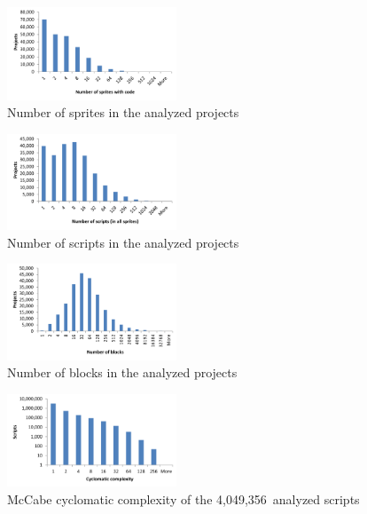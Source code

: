 \documentclass{sig-alternate-05-2015}
\newcommand{\nscripts}{4,049,356}
\begin{document}
\begin{figure}
	\centering
	\includegraphics[width=0.45\textwidth]{fig/charts/1sprites}
	\vspace{-1em}
	\caption{Number of sprites in the analyzed projects}
	\label{fig:size-sprites}
\end{figure}
\begin{figure}
	\centering
	\includegraphics[width=0.45\textwidth]{fig/charts/1scripts}
	\vspace{-1em}
	\caption{Number of scripts in the analyzed projects}
	\label{fig:size-scripts}
\end{figure}
\begin{figure}
	\centering
	\includegraphics[width=0.45\textwidth]{fig/charts/1locs}
	\vspace{-1em}
	\caption{Number of blocks in the analyzed projects}
	\label{fig:size-locs}
\end{figure}
\begin{figure}
	\centering
	\includegraphics[width=0.45\textwidth]{fig/charts/3cyclomatic}
	\vspace{-1em}
	\caption{McCabe cyclomatic complexity of the \nscripts~analyzed scripts}
	\label{fig:cyclomatic}
\end{figure}
\end{document}
